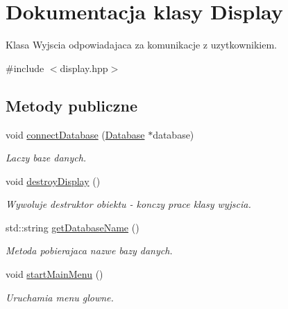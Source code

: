 \hypertarget{class_display}{}\section{Dokumentacja klasy Display}
\label{class_display}


Klasa Wyjscia odpowiadajaca za komunikacje z uzytkownikiem.  




{\ttfamily \#include $<$display.\+hpp$>$}

\subsection*{Metody publiczne}
\begin{DoxyCompactItemize}
\item 
\mbox{\label{class_display_a29169f26fa9668f8a370d1c26bc7d5ba}} 
void \mbox{\hyperlink{class_display_a29169f26fa9668f8a370d1c26bc7d5ba}{connect\+Database}} (\mbox{\hyperlink{class_database}{Database}} $\ast$database)
\begin{DoxyCompactList}\small\item\em Laczy baze danych. \end{DoxyCompactList}\item 
\mbox{\label{class_display_a42cdd77de47fd4ebd5a99cfbe1fdba3b}} 
void \mbox{\hyperlink{class_display_a42cdd77de47fd4ebd5a99cfbe1fdba3b}{destroy\+Display}} ()
\begin{DoxyCompactList}\small\item\em Wywoluje destruktor obiektu -\/ konczy prace klasy wyjscia. \end{DoxyCompactList}\item 
\mbox{\label{class_display_a7a1dce8e6c3149170ecbffc983d2a859}} 
std\+::string \mbox{\hyperlink{class_display_a7a1dce8e6c3149170ecbffc983d2a859}{get\+Database\+Name}} ()
\begin{DoxyCompactList}\small\item\em Metoda pobierajaca nazwe bazy danych. \end{DoxyCompactList}\item 
\mbox{\label{class_display_ac4e3345a1de41423b538343d3c4f77d2}} 
void \mbox{\hyperlink{class_display_ac4e3345a1de41423b538343d3c4f77d2}{start\+Main\+Menu}} ()
\begin{DoxyCompactList}\small\item\em Uruchamia menu glowne. \end{DoxyCompactList}\end{DoxyCompactItemize}
